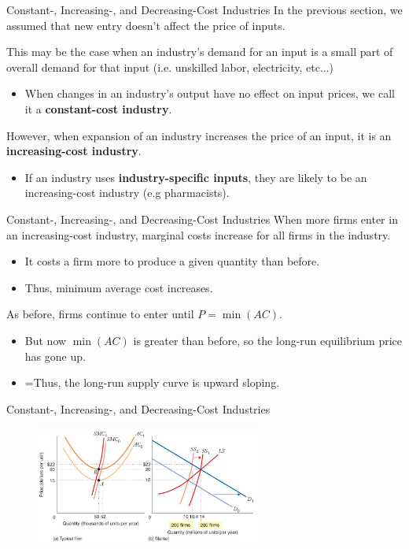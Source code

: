 \documentclass[11pt,t]{beamer}
\begin{document}
\begin{frame}{Constant-, Increasing-, and Decreasing-Cost Industries}
  In the previous section, we assumed that new entry doesn't affect the price of inputs.

  \bigskip
  This may be the case when an industry's demand for an input is a small part of overall demand for that input (i.e. unskilled labor, electricity, etc...)
  
  \begin{itemize}
    \item When changes in an industry's output have no effect on input prices, we call it a \textbf{constant-cost industry}.
  \end{itemize}
  
  \bigskip\pause
  However, when expansion of an industry increases the price of an input, it is an \textbf{increasing-cost industry}.
  \begin{itemize}
    \item If an industry uses \textbf{industry-specific inputs}, they are likely to be an increasing-cost industry (e.g pharmacists).
  \end{itemize}
\end{frame}

\begin{frame}{Constant-, Increasing-, and Decreasing-Cost Industries}
  When more firms enter in an increasing-cost industry, marginal costs increase for all firms in the industry.

  \begin{itemize}
    \item It costs a firm more to produce a given quantity than before.
    
    \item Thus, minimum average cost increases.
  \end{itemize}

  \bigskip
  As before, firms continue to enter until $P=\min(AC)$.

  \begin{itemize}
    \item But now $\min(AC)$ is greater than before, so the long-run equilibrium price has gone up.
    
    \item =Thus, the long-run supply curve is upward sloping.
  \end{itemize}

\end{frame}

\begin{frame}{Constant-, Increasing-, and Decreasing-Cost Industries}
  \begin{figure}
    \includegraphics[width=280px]{figures/fig9_18.jpg}
  \end{figure}
\end{frame}
\end{document}
